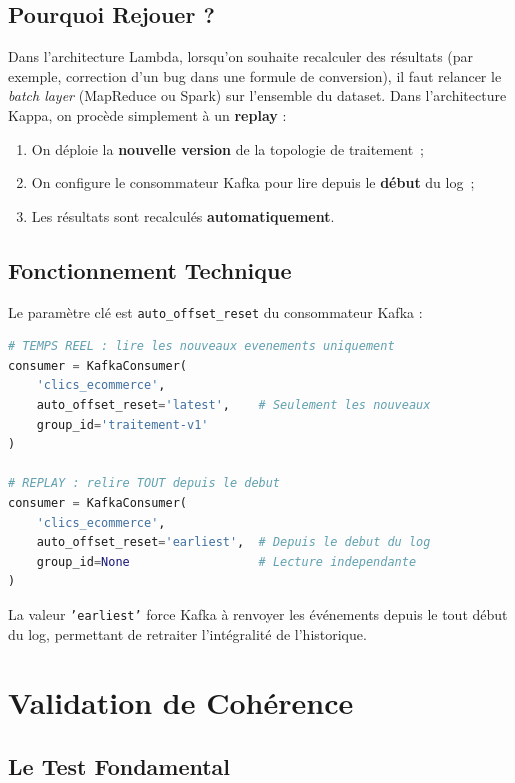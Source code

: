 \subsection{Pourquoi Rejouer ?}

Dans l'architecture Lambda, lorsqu'on souhaite recalculer des résultats (par exemple, correction d'un bug dans une formule de conversion), il faut relancer le \textit{batch layer} (MapReduce ou Spark) sur l'ensemble du dataset. Dans l'architecture Kappa, on procède simplement à un \textbf{replay} :

\begin{enumerate}
    \item On déploie la \textbf{nouvelle version} de la topologie de traitement~;
    \item On configure le consommateur Kafka pour lire depuis le \textbf{début} du log~;
    \item Les résultats sont recalculés \textbf{automatiquement}.
\end{enumerate}

\subsection{Fonctionnement Technique}

Le paramètre clé est \texttt{auto\_offset\_reset} du consommateur Kafka :

\begin{lstlisting}[language=Python, caption={Différence entre traitement temps réel et replay}]
# TEMPS REEL : lire les nouveaux evenements uniquement
consumer = KafkaConsumer(
    'clics_ecommerce',
    auto_offset_reset='latest',    # Seulement les nouveaux
    group_id='traitement-v1'
)

# REPLAY : relire TOUT depuis le debut
consumer = KafkaConsumer(
    'clics_ecommerce',
    auto_offset_reset='earliest',  # Depuis le debut du log
    group_id=None                  # Lecture independante
)
\end{lstlisting}

La valeur \texttt{'earliest'} force Kafka à renvoyer les événements depuis le tout début du log, permettant de retraiter l'intégralité de l'historique.

\section{Validation de Cohérence}

\subsection{Le Test Fondamental}

